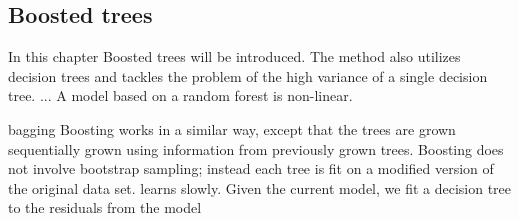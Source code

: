 \subsection{Boosted trees}

In this chapter Boosted trees will be introduced. The method also utilizes decision trees and tackles the problem of the high variance of a single decision tree. 
...
A model based on a random forest is non-linear.

bagging
Boosting works in a similar way, except that the trees are grown sequentially
grown using information from previously grown trees. Boosting does not involve bootstrap sampling; instead each tree is fit on a modified version of the original data set.
learns slowly. Given the current model, we fit a decision tree to the residuals from the model


